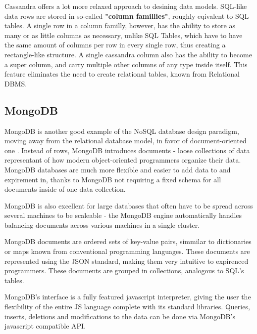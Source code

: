 \par Cassandra offers a lot more relaxed approach to desining data models. SQL-like data rows are stored in so-called \textbf{"column famillies"}, roughly eqivalent to SQL tables. A single row in a column familly, however, has the ability to store as many or as little columns as necessary, unlike SQL Tables, which have to have the same amount of columns per row in every single row, thus creating a rectangle-like structure. A single cassandra column also has the ability to become a super column, and carry multiple other columns of any type inside itself. This feature eliminates the need to create relational tables, known from Relational DBMS\citep{HewittCassandra}.

\subsection{MongoDB}
\label{subsec:background:second_section:second_subsection}
\par MongoDB is another good example of the NoSQL database design paradigm, moving away from the relational database model, in favor of document-oriented one \citep{mongoDB}. Instead of rows, MongoDB introduces documents - loose collections of data representant of how modern object-oriented programmers organize their data. MongoDB databases are much more flexible and easier to add data to and expirement in, thanks to MongoDB not requiring a fixed schema for all documents inside of one data collection.
%
\par MongoDB is also excellent for large databases that often have to be spread across several machines to be scaleable - the MongoDB engine automatically handles balancing documents across various machines in a single cluster\citep{mongoDB}. 

\par MongoDB documents are ordered sets of key-value pairs, simmilar to dictionaries or maps known from conventional programming languages. These documents are represented using the JSON standard, making them very intuitive to expirenced programmers. These documents are grouped in collections, analogous to SQL's tables\citep{mongoDB}. 

\par MongoDB's interface is a fully featured javascript interpreter, giving the user the flexibility of the entire JS language complete with its standard libraries. Queries, inserts, deletions and modifications to the data can be done via MongoDB's javascript compatible API\citep{mongoDB}.

